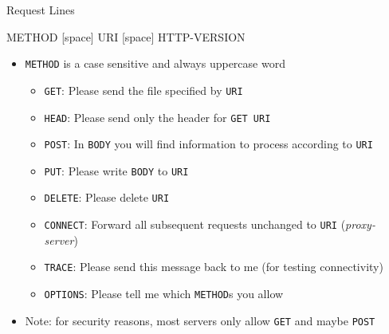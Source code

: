 \begin{frame}{Request Lines}
%
\begin{codebox}
\ttfamily
METHOD [space] URI [space] HTTP-VERSION
\end{codebox}
%
\begin{itemize}
\item \texttt{METHOD} is a case sensitive and always uppercase word
	\begin{itemize}
	\item \texttt{GET}: Please send the file specified by \texttt{URI}
	\item \texttt{HEAD}: Please send only the header for \texttt{GET URI}
	\item \texttt{POST}: In \texttt{BODY} you will find information to process according to \texttt{URI}
	\item \texttt{PUT}: Please write \texttt{BODY} to \texttt{URI}
	\item \texttt{DELETE}: Please delete \texttt{URI}
	\item \texttt{CONNECT}: Forward all subsequent requests unchanged to \texttt{URI} (\thus \emph{proxy-server})
	\item \texttt{TRACE}: Please send this message back to me (for testing connectivity)
	\item \texttt{OPTIONS}: Please tell me which \texttt{METHOD}s you allow
	\end{itemize}
\item Note: for security reasons, most servers only allow \texttt{GET} and maybe \texttt{POST}
\end{itemize}
%
\end{frame}


